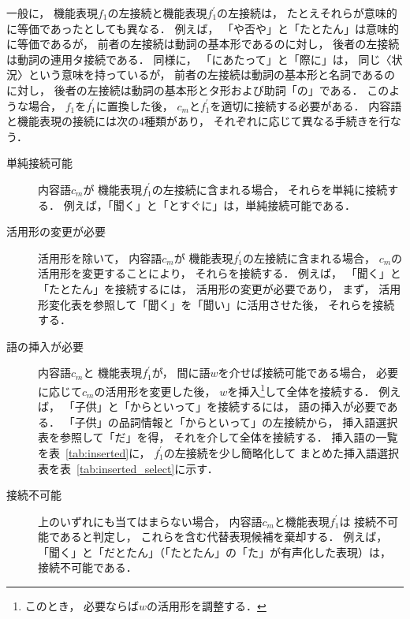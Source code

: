 \documentclass[japanese]{jnlp_1.4}
\begin{document}
一般に，
機能表現$f_1$の左接続と機能表現$f_1^\prime$の左接続は，
たとえそれらが意味的に等価であったとしても異なる．
例えば，
「や否や」と「たとたん」は意味的に等価であるが，
前者の左接続は動詞の基本形であるのに対し，
後者の左接続は動詞の連用タ接続である．
同様に，
「にあたって」と「際に」は，
同じ〈状況〉という意味を持っているが，
前者の左接続は動詞の基本形と名詞であるのに対し，
後者の左接続は動詞の基本形とタ形および助詞「の」である．
このような場合，
$f_1$を$f_1^\prime$に置換した後，
$c_m$と$f_1^{\prime}$を適切に接続する必要がある．
内容語と機能表現の接続には次の4種類があり，
それぞれに応じて異なる手続きを行なう．
\begin{description}
\item[単純接続可能] 内容語$c_m$が
           機能表現$f_1^{\prime}$の左接続に含まれる場合，
           それらを単純に接続する．
           例えば，「聞く」と「とすぐに」は，単純接続可能である．

\item[活用形の変更が必要] 活用形を除いて，
           内容語$c_m$が
           機能表現$f_1^{\prime}$の左接続に含まれる場合，
           $c_m$の活用形を変更することにより，
           それらを接続する．
           例えば，
           「聞く」と「たとたん」を接続するには，
           活用形の変更が必要であり，
           まず，
           活用形変化表を参照して「聞く」を「聞い」に活用させた後，
           それらを接続する．

\item[語の挿入が必要] 内容語$c_m$と
           機能表現$f_1^{\prime}$が，
           間に語$w$を介せば接続可能である場合，
           必要に応じて$c_m$の活用形を変更した後，
           $w$を挿入\footnote{
	このとき，
        必要ならば$w$の活用形を調整する．
           }して全体を接続する．
           例えば，
           「子供」と「からといって」を接続するには，
           語の挿入が必要である．
           「子供」の品詞情報と「からといって」の左接続から，
           挿入語選択表を参照して「だ」を得，
           それを介して全体を接続する．
           挿入語の一覧を表~\ref{tab:inserted}に，
           $f_1^{\prime}$の左接続を少し簡略化して
           まとめた挿入語選択表を表~\ref{tab:inserted_select}に示す．
           
\item[接続不可能] 上のいずれにも当てはまらない場合，
           内容語$c_m$と機能表現$f_1^{\prime}$は
           接続不可能であると判定し，
           これらを含む代替表現候補を棄却する．
           例えば，
           「聞く」と「だとたん」（「たとたん」の「た」が有声化した表現）は，
           接続不可能である．
\end{description}
\end{document}

